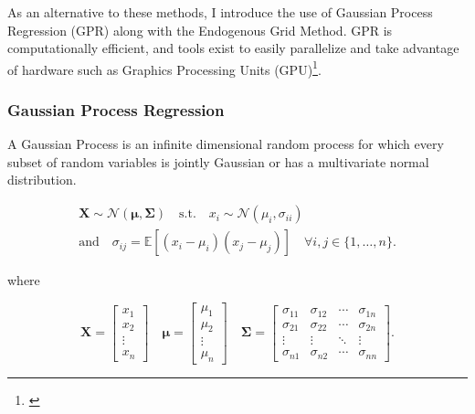 \documentclass{article}
\newcommand{\Ex}{\mathbb{E}}
\begin{document}
As an alternative to these methods, I introduce the use of Gaussian Process Regression (GPR) along with the Endogenous Grid Method. GPR is computationally efficient, and tools exist to easily parallelize and take advantage of hardware such as Graphics Processing Units (GPU)\footnote{\citet{Gardner2018}}.


\subsubsection{Gaussian Process Regression}\label{Gaussian Process Regression}

A Gaussian Process is an infinite dimensional random process for which every subset of random variables is jointly Gaussian or has a multivariate normal distribution.

\begin{equation}
\begin{gathered}
    \mathbf{X} \sim \mathcal{N}(\mathbf{\mu}, \mathbf{\Sigma}) \quad \text{s.t.} \quad x_i \sim \mathcal{N}(\mu_i, \sigma_{ii}) \\
    \text{and} \quad  \sigma_{ij} = \Ex[(x_i - \mu_i)(x_j - \mu_j)] \quad \forall i,j \in \{1, \ldots, n\}.
  \end{gathered}
\end{equation}

where

\begin{equation}
\mathbf{X} = \begin{bmatrix}
    x_1    \\
    x_2    \\
    \vdots \\
    x_n
  \end{bmatrix}
  \quad
  \mathbf{\mu} = \begin{bmatrix}
    \mu_1  \\
    \mu_2  \\
    \vdots \\
    \mu_n
  \end{bmatrix}
  \quad
  \mathbf{\Sigma} = \begin{bmatrix}
    \sigma_{11} & \sigma_{12} & \cdots & \sigma_{1n} \\
    \sigma_{21} & \sigma_{22} & \cdots & \sigma_{2n} \\
    \vdots      & \vdots      & \ddots & \vdots      \\
    \sigma_{n1} & \sigma_{n2} & \cdots & \sigma_{nn}
  \end{bmatrix}.
\end{equation}
\end{document}
